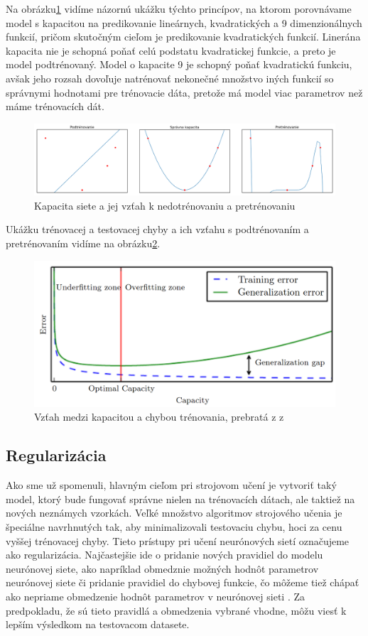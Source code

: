 \indent Na obrázku\ref{fig:capacity} vidíme názornú ukážku týchto princípov, na ktorom porovnávame model s kapacitou na predikovanie lineárnych, kvadratických a 9 dimenzionálnych funkcií, pričom skutočným cieľom je predikovanie kvadratických funkcií. Linerána kapacita nie je schopná poňať celú podstatu kvadratickej funkcie, a preto je model podtrénovaný. Model o kapacite 9 je schopný poňať kvadratickú funkciu, avšak jeho rozsah dovoľuje natrénovať nekonečné množstvo iných funkcií so správnymi hodnotami pre trénovacie dáta, pretože má model viac parametrov než máme trénovacích dát. 

\begin{figure}[H]
	\centering
	\includegraphics[width=1\linewidth]{img/capacity}
	\caption{Kapacita siete a jej vzťah k nedotrénovaniu a pretrénovaniu}
	\label{fig:capacity}
\end{figure}

\indent Ukážku trénovacej a testovacej chyby a ich vzťahu s podtrénovaním a pretrénovaním vidíme na obrázku\ref{fig:errors}.

\begin{figure}[H]
	\centering
	\includegraphics[width=.5\linewidth]{img/errors}
	\caption{Vzťah medzi kapacitou a chybou trénovania,  prebratá z z\cite[s.~115]{goodfellow2016deep}}
	\label{fig:errors}
\end{figure}

\subsection{Regularizácia}
Ako sme už spomenuli, hlavným cieľom pri strojovom učení je vytvoriť taký model, ktorý bude fungovať správne nielen na trénovacích dátach, ale taktiež na nových neznámych vzorkách.
Veľké množstvo algoritmov strojového učenia je špeciálne navrhnutých tak, aby minimalizovali testovaciu chybu, hoci za cenu vyššej trénovacej chyby.
Tieto prístupy pri učení neurónových sietí označujeme ako regularizácia\cite{nielsen2015chapter}.
Najčastejšie ide o pridanie nových pravidiel do modelu neurónovej siete, ako napríklad obmedznie možných hodnôt parametrov neurónovej siete či pridanie pravidiel do chybovej funkcie, čo môžeme tiež chápať ako nepriame obmedzenie hodnôt parametrov v neurónovej sieti \cite{goodfellow2016deep}.
Za predpokladu, že sú tieto pravidlá a obmedzenia vybrané vhodne, môžu viesť k lepším výsledkom na testovacom datasete.

